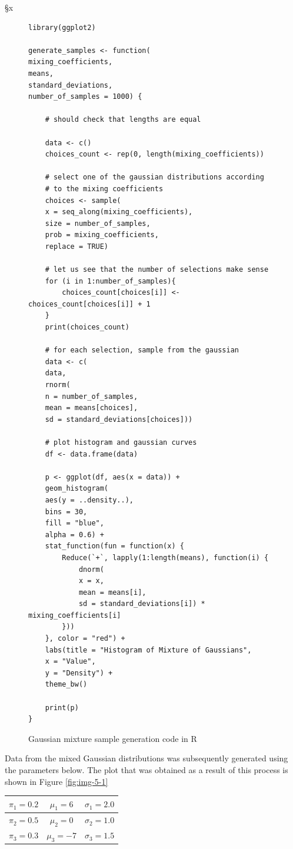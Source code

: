 §x\documentclass[]{article}
\begin{document}
\begin{figure}[H]
	\captionsetup{type=lstlisting}
	\begin{lstlisting}
library(ggplot2)

generate_samples <- function(
mixing_coefficients,
means,
standard_deviations,
number_of_samples = 1000) {
	
	# should check that lengths are equal
	
	data <- c()
	choices_count <- rep(0, length(mixing_coefficients))
	
	# select one of the gaussian distributions according
	# to the mixing coefficients
	choices <- sample(
	x = seq_along(mixing_coefficients),
	size = number_of_samples,
	prob = mixing_coefficients,
	replace = TRUE)
	
	# let us see that the number of selections make sense
	for (i in 1:number_of_samples){
		choices_count[choices[i]] <- choices_count[choices[i]] + 1
	}
	print(choices_count)
	
	# for each selection, sample from the gaussian
	data <- c(
	data,
	rnorm(
	n = number_of_samples,
	mean = means[choices],
	sd = standard_deviations[choices]))
	
	# plot histogram and gaussian curves
	df <- data.frame(data)
	
	p <- ggplot(df, aes(x = data)) +
	geom_histogram(
	aes(y = ..density..),
	bins = 30,
	fill = "blue",
	alpha = 0.6) +
	stat_function(fun = function(x) {
		Reduce(`+`, lapply(1:length(means), function(i) {
			dnorm(
			x = x,
			mean = means[i],
			sd = standard_deviations[i]) * mixing_coefficients[i]
		}))
	}, color = "red") +
	labs(title = "Histogram of Mixture of Gaussians",
	x = "Value",
	y = "Density") +
	theme_bw()
	
	print(p)
}
	\end{lstlisting}
	\caption{Gaussian mixture sample generation code in R}
	\label{lst:gausmix}
\end{figure}

\noindent Data from the mixed Gaussian distributions was subsequently generated using the parameters below. The plot that was obtained as a result of this process is shown in Figure \ref{fig:img-5-1}

\begin{table}[h]
	\centering
	\renewcommand{\arraystretch}{1.2} %
	\begin{tabular}{|c|c|c|}
		\hline
		$\pi_1 = 0.2$ & $\mu_1 = 6$  & $\sigma_1 = 2.0$  \\
		\hline
		$\pi_2 = 0.5$ & $\mu_2 = 0$  & $\sigma_2 = 1.0$  \\
		\hline
		$\pi_3 = 0.3$ & $\mu_3 = -7$ & $\sigma_3 = 1.5$  \\
		\hline
	\end{tabular}
\end{table}
\end{document}
